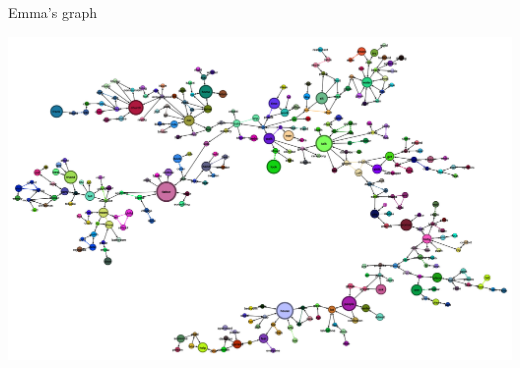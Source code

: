 \documentclass[xcolor=x11names,compress]{beamer}
\begin{document}
{
\begin{frame}[t]{Emma's graph}
    \begin{minipage}[t]{\textwidth}
        \centering
        \includegraphics[width=\textwidth]{immagini/emma_ml_lv0}
    \end{minipage}
\end{frame}}
\end{document}
